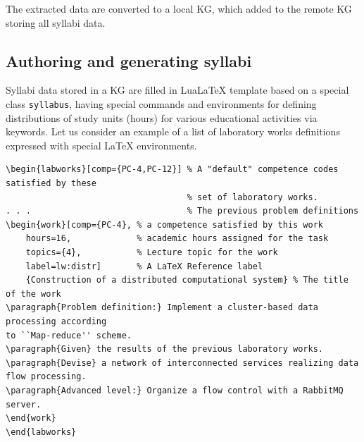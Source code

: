 \documentclass[
]{ceurart}
\providecommand{\LuaLaTeX}{Lua\LaTeX}
\begin{document}
The extracted data are converted to a local KG, which added to the remote KG storing all syllabi data.

\subsection{Authoring and generating syllabi}

Syllabi data stored in a KG are filled in \LuaLaTeX{} template based on a special class \verb|syllabus|, having special commands and environments for defining distributions of study units (hours) for various educational activities via keywords.  Let us consider an example of a list of laboratory works definitions expressed with special \LaTeX{} environments.

\begin{verbatim}
\begin{labworks}[comp={PC-4,PC-12}] % A "default" competence codes satisfied by these
                                    % set of laboratory works.
. . .                               % The previous problem definitions
\begin{work}[comp={PC-4}, % a competence satisfied by this work
    hours=16,             % academic hours assigned for the task
    topics={4},           % Lecture topic for the work
    label=lw:distr]       % A LaTeX Reference label
    {Construction of a distributed computational system} % The title of the work
\paragraph{Problem definition:} Implement a cluster-based data processing according
to ``Map-reduce'' scheme.
\paragraph{Given} the results of the previous laboratory works.
\paragraph{Devise} a network of interconnected services realizing data flow processing.
\paragraph{Advanced level:} Organize a flow control with a RabbitMQ server.
\end{work}
\end{labworks}
\end{verbatim}
\end{document}
